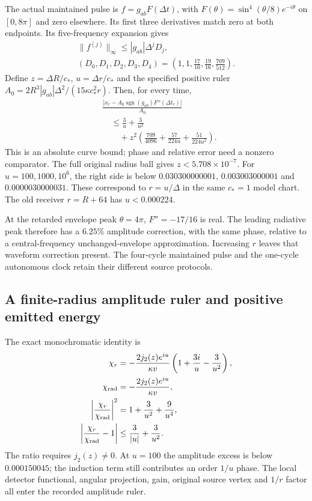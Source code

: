 The actual maintained pulse is $f=g_{ab}F(\Delta t)$, with
$F(\theta)=\sin^4(\theta/8)e^{-i\theta}$ on $[0,8\pi]$ and zero elsewhere.
Its first three derivatives match zero at both endpoints. Its five-frequency
expansion gives
\[
 \begin{gathered}
 \|f^{(j)}\|_\infty\leq |g_{ab}|\Delta^jD_j,\\
 (D_0,D_1,D_2,D_3,D_4)
   =\left(1,1,\frac{17}{16},\frac{19}{16},\frac{709}{512}\right).
 \end{gathered}
\]
Define $z=\Delta R/c_*$, $u=\Delta r/c_*$ and the specified positive ruler
$A_0=2R^3|g_{ab}|\Delta^2/(15\kappa c_*^2r)$. Then, for every time,
\begin{equation}
 \begin{aligned}
 &\frac{|x_r-A_0\operatorname{sgn}(g_{ab})F''(\Delta t_r)|}{A_0}\\
 &\quad\leq\frac3u+\frac3{u^2}\\
 &\qquad+z^2\left(\frac{709}{4096}+\frac{57}{224u}
                               +\frac{51}{224u^2}\right).
 \end{aligned}
 \label{eq:radiation-ruler-bound}
\end{equation}
This is an absolute curve bound; phase and relative error need a nonzero
comparator. The full original radius ball gives $z<5.708\times10^{-7}$.
For $u=100,1000,10^6$, the right side is below
$0.030300000001$, $0.003003000001$ and $0.0000030000031$.
These correspond to $r=u/\Delta$ in the same $c_*=1$ model chart.
The old receiver $r=R+64$ has $u<0.000224$.

At the retarded envelope peak $\theta=4\pi$, $F''=-17/16$ is real.
The leading radiative peak therefore has a $6.25\%$ amplitude correction,
with the same phase, relative to a central-frequency unchanged-envelope
approximation. Increasing $r$ leaves that waveform correction present.
The four-cycle maintained pulse and the one-cycle autonomous clock retain
their different source protocols.

\subsection{A finite-radius amplitude ruler and positive emitted energy}
The exact monochromatic identity is
\begin{align}
 \chi_r&=-\frac{2j_2(z)e^{iu}}{\kappa v}
                 \left(1+\frac{3i}{u}-\frac3{u^2}\right),\\
 \chi_{\rm rad}&=-\frac{2j_2(z)e^{iu}}{\kappa v},\\
 \left|\frac{\chi_r}{\chi_{\rm rad}}\right|^2
 &=1+\frac3{u^2}+\frac9{u^4},\\
 \left|\frac{\chi_r}{\chi_{\rm rad}}-1\right|
 &\leq\frac3{|u|}+\frac3{u^2}.
\end{align}
The ratio requires $j_2(z)\ne0$. At $u=100$ the amplitude excess is below
$0.000150045$; the induction term still contributes an order $1/u$ phase.
The local detector functional, angular projection, gain, original source
vertex and $1/r$ factor all enter the recorded amplitude ruler.

